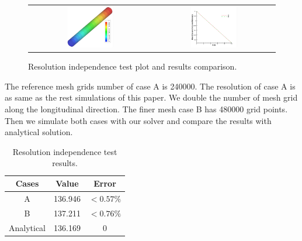 \begin{figure}[H]
	\centering
	\begin{tabular}{cc}
		\includegraphics[width=0.4\textwidth]{./pics/plotbio.png} & \includegraphics[width=0.4\textwidth]{./pics/resolution.png}
	\end{tabular}
	\caption{\footnotesize Resolution independence test plot and results comparison.}
\end{figure}

The reference mesh grids number of case A is 240000. The resolution of case A is as same as the rest simulations of this paper. We double the number of mesh grid along the longitudinal direction. The finer mesh case B has 480000 grid points. Then we simulate both cases with our solver and compare the results with analytical solution.

\begin{table}[h]
	\caption{Resolution independence test results.}
	\vspace{-5pt}
	\begin{center}
	\begin{tabular}{|c|c|c|}
		\hline
		\textbf{Cases} &\textbf{Value} & \textbf{Error}\\
		\hline
		A & 136.946 & $<0.57\%$\\
		\hline
		B & 137.211 & $<0.76\%$\\
		\hline
		Analytical & 136.169 & 0 \\
		\hline
	\end{tabular}
	\end{center} 
\end{table}

